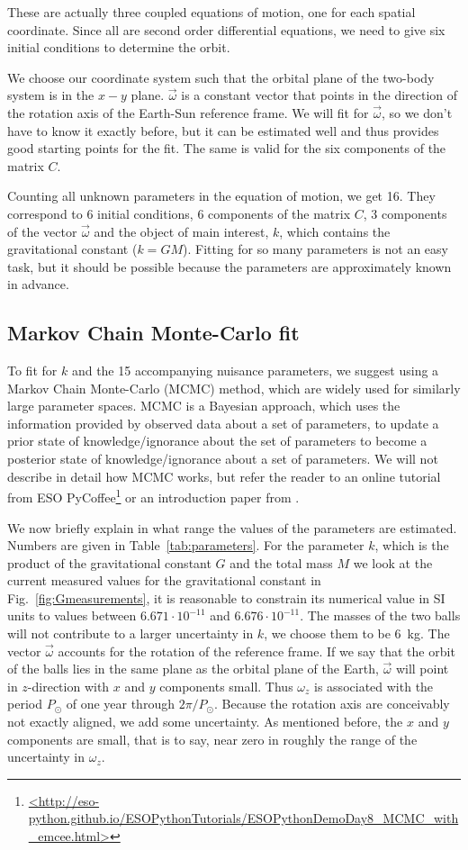 \documentclass[onecolumn]{aa} %
\begin{document}
These are actually three coupled equations of motion, one for each spatial coordinate. Since all are second order differential equations, we need to give six initial conditions to determine the orbit.

We choose our coordinate system such that the orbital plane of the two-body system is in the $x-y$ plane. $\vec{\omega}$ is a constant vector that points in the direction of the rotation axis of the Earth-Sun reference frame. We will fit for $\vec{\omega}$, so we don't have to know it exactly before, but it can be estimated well and thus provides good starting points for the fit. The same is valid for the six components of the matrix $C$.

Counting all unknown parameters in the equation of motion, we get
16. They correspond to 6 initial conditions, 6 components of the
matrix $C$, 3 components of the vector $\vec{\omega}$ and the object
of main interest, $k$, which contains the gravitational constant ($k =
GM$). Fitting for so many parameters is not an easy task, but it
should be possible because the parameters are approximately known in
advance.

\subsection{Markov Chain Monte-Carlo fit}

To fit for $k$ and the 15 accompanying nuisance parameters, we suggest
using a Markov Chain Monte-Carlo (MCMC) method, which are widely used
for similarly large parameter spaces.  MCMC is a Bayesian approach,
which uses the information provided by observed data about a set of
parameters, to update a prior state of knowledge/ignorance about the
set of parameters to become a posterior state of knowledge/ignorance
about a set of parameters. We will not describe in detail how MCMC
works, but refer the reader to an online tutorial from ESO
PyCoffee\footnote{\url{<http://eso-python.github.io/ESOPythonTutorials/ESOPythonDemoDay8_MCMC_with_emcee.html>}}
or an introduction paper from \cite{vanRavenzwaaij16}.

We now briefly explain in what range the values of the parameters are
estimated.  Numbers are given in Table~\ref{tab:parameters}.  For the
parameter $k$, which is the product of the gravitational constant $G$
and the total mass $M$ we look at the current measured values for the
gravitational constant in Fig.~\ref{fig:Gmeasurements}, it is
reasonable to constrain its numerical value in SI units to values
between $6.671 \cdot 10^{-11}$ and $6.676 \cdot 10^{-11}$. The masses
of the two balls will not contribute to a larger uncertainty in $k$,
we choose them to be 6~kg.  The vector $\vec{\omega}$ accounts for the
rotation of the reference frame. If we say that the orbit of the balls
lies in the same plane as the orbital plane of the Earth,
$\vec{\omega}$ will point in $z$-direction with $x$ and $y$
components small. Thus $\omega_z$ is associated with the period
$P_\odot$ of one year through $2\pi/P_\odot$. Because the rotation
axis are conceivably not exactly aligned, we add some uncertainty. As
mentioned before, the $x$ and $y$ components are small, that is to
say, near zero in roughly the range of the uncertainty in
$\omega_z$.
\end{document}
